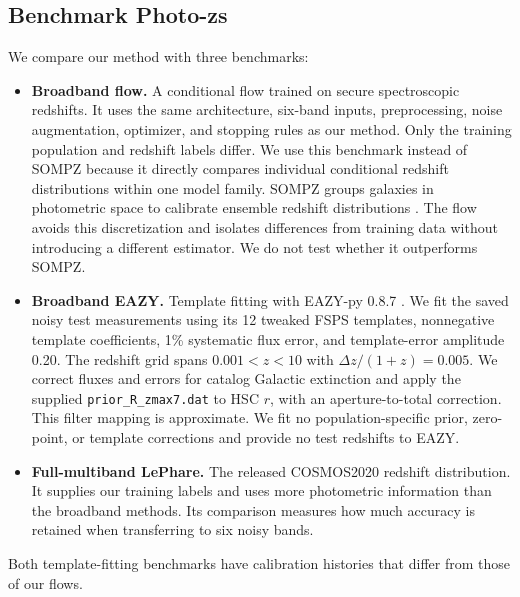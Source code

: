 \subsection{Benchmark Photo-zs}
We compare our method with three benchmarks:
\begin{itemize}
\item \textbf{Broadband flow.} A conditional flow trained on secure
spectroscopic redshifts. It uses the same architecture, six-band inputs,
preprocessing, noise augmentation, optimizer, and stopping rules as our
method. Only the training population and redshift labels differ.
We use this benchmark instead of SOMPZ because it directly compares
individual conditional redshift distributions within one model family.
SOMPZ groups galaxies in photometric space to calibrate ensemble redshift
distributions \citep{buchs2019,myles2021}. The flow avoids this discretization
and isolates differences from training data without introducing a different
estimator. We do not test whether it outperforms SOMPZ.

\item \textbf{Broadband EAZY.} Template fitting with EAZY-py 0.8.7
\citep{brammer2008}. We fit the saved noisy test measurements using its
12 tweaked FSPS templates, nonnegative template coefficients, 1\% systematic
flux error, and template-error amplitude 0.20. The redshift grid spans
$0.001<z<10$ with $\Delta z/(1+z)=0.005$. We correct fluxes and errors for
catalog Galactic extinction and apply the supplied
\texttt{prior\_R\_zmax7.dat} to HSC $r$, with an aperture-to-total correction.
This filter mapping is approximate. We fit no population-specific prior,
zero-point, or template corrections and provide no test redshifts to EAZY.

\item \textbf{Full-multiband LePhare.} The released COSMOS2020 redshift
distribution.
It supplies our training labels and uses more photometric information than
the broadband methods. Its comparison measures how much accuracy is retained
when transferring to six noisy bands.
\end{itemize}
Both template-fitting benchmarks have calibration histories that differ
from those of our flows.
